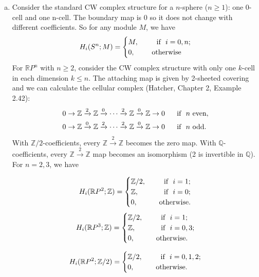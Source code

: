 \documentclass[a4paper, 12pt]{article}
\begin{document}
\begin{solution}
\begin{enumerate}[(a)]
\item Consider the standard CW complex structure for a \(n\)-sphere (\(n\geq 1\)): one 0-cell and one n-cell. The boundary map is 0 so it does not change with different coefficients. So for any module \(M\), we have 
\[H_i(S^n;M)=\begin{cases}
	M,&\ \ \ \ \ \text{if}\ \  i=0,n;\\ 
	0,&\ \ \ \text{otherwise}
\end{cases}\] 
For \(\mathbb{R}P^n\) with \(n\geq 2\), consider the CW complex structure with only one \(k\)-cell in each dimension \(k\leq n\). The attaching map is given by 2-sheeted covering and we can calculate the cellular complex (Hatcher, Chapter 2, Example 2.42): 
\begin{align*}
	0\rightarrow \mathbb{Z}\xrightarrow{2} \mathbb{Z}\xrightarrow{0}\cdots\xrightarrow{2}\mathbb{Z}\xrightarrow{0}\mathbb{Z}\rightarrow 0 & \ \ \ \ \ \text{if}\ \  n\ \text{even},\\ 
	0\rightarrow \mathbb{Z}\xrightarrow{0} \mathbb{Z}\xrightarrow{2}\cdots\xrightarrow{2}\mathbb{Z}\xrightarrow{0}\mathbb{Z}\rightarrow 0 & \ \ \ \ \ \text{if}\ \  n\ \text{odd}.
\end{align*}
With \(\mathbb{Z}/2\)-coefficients, every \(\mathbb{Z}\xrightarrow{2}\mathbb{Z}\) becomes the zero map. With \(\mathbb{Q}\)-coefficients, every \(\mathbb{Z}\xrightarrow{2}\mathbb{Z}\) map becomes an isomorphism (2 is invertible in \(\mathbb{Q}\)). For \(n=2,3\), we have 
\begin{multicols}{2}
\noindent
	\[H_i(\mathbb{R}P^2;\mathbb{Z})=\begin{cases}
	\mathbb{Z}/2,&\ \ \ \ \ \text{if}\ \  i=1;\\ 
	\mathbb{Z},&\ \ \ \ \ \text{if}\ \  i=0;\\ 
	0,&\ \ \ \text{otherwise}.
\end{cases}\]
\[H_i(\mathbb{R}P^3;\mathbb{Z})=\begin{cases}
	\mathbb{Z}/2,&\ \ \ \ \ \text{if}\ \  i=1;\\ 
	\mathbb{Z},&\ \ \ \ \ \text{if}\ \  i=0,3;\\
	0,&\ \ \ \text{otherwise}.
\end{cases}\]
\end{multicols}
\begin{multicols}{2}
\noindent 
\[H_i(\mathbb{R}P^2;\mathbb{Z}/2)=\begin{cases}
	\mathbb{Z}/2,&\ \ \ \ \ \text{if}\ \  i=0,1,2;\\ 
	0,&\ \ \ \text{otherwise}.

\end{cases}\]
\end{multicols}
\end{enumerate}
\end{solution}
\end{document}
